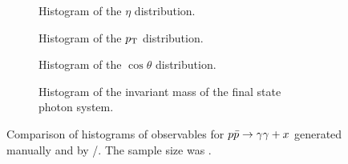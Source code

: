 \begin{figure}[hp]
  \centering
  \begin{subfigure}{.49\textwidth}
    \centering {}
    \caption{\label{fig:pdf-eta} Histogram of the \(\eta\)
      distribution.}
  \end{subfigure}
  \begin{subfigure}{.49\textwidth}
    \centering {}
    \caption{\label{fig:pdf-pt} Histogram of the \(p_\mathrm{T}\)
      distribution.}
  \end{subfigure}
  \begin{subfigure}{.49\textwidth}
    \centering {}
    \caption{\label{fig:pdf-cos-theta} Histogram of the \(\cos\theta\)
      distribution.}
  \end{subfigure}
  \begin{subfigure}{.49\textwidth}
    \centering {}
    \caption[Histogram of the invariant mass of the final state photon
    system.]{\label{fig:pdf-inv-m} Histogram of the invariant mass of the
      final state photon system. %
    }
  \end{subfigure}
  \caption{\label{fig:pdf-histos}Comparison of histograms of
    observables for \(p\bar{p}\rightarrow\gamma\gamma + x\) generated manually and by
    \sherpa/\rivet. The sample size was \protect
    .}
\end{figure}
